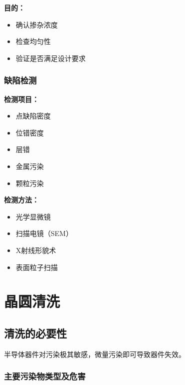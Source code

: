 \documentclass[UTF8,12pt,a4paper]{ctexart}
\begin{document}
\textbf{目的：}
\begin{itemize}
    \item 确认掺杂浓度
    \item 检查均匀性
    \item 验证是否满足设计要求
\end{itemize}

\subsubsection{缺陷检测}

\textbf{检测项目：}
\begin{itemize}
    \item 点缺陷密度
    \item 位错密度
    \item 层错
    \item 金属污染
    \item 颗粒污染
\end{itemize}

\textbf{检测方法：}
\begin{itemize}
    \item 光学显微镜
    \item 扫描电镜（SEM）
    \item X射线形貌术
    \item 表面粒子扫描
\end{itemize}

\section{晶圆清洗}

\subsection{清洗的必要性}

半导体器件对污染极其敏感，微量污染即可导致器件失效。

\subsubsection{主要污染物类型及危害}
\end{document}
